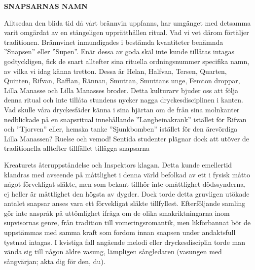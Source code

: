 \begin{intersong}

\textbf{SNAPSARNAS NAMN}

\begin{scriptsize}
Alltsedan den blida tid då vårt brännvin uppfanns, har umgänget med detsamma varit omgärdat av en stängeligen upprätthållen ritual. Vad vi vet därom förtäljer traditionen. Brännvinet inmundigades i bestämda kvantiteter benämnda ''Snapsen'' eller ''Supen''. Enär dessa av goda skäl inte kunde tillåtas intagas godtyckligen, fick de snart alltefter sina rituella ordningsnummer specifika namn, av vilka vi idag känna tretton. Dessa är Helan, Halfvan, Tersen, Quarten, Quinten, Rifvan, Rafflan, Rännan, Smuttan, Smuttans unge, Femton droppar, Lilla Manasse och Lilla Manasses broder. Detta kulturarv bjuder oss att följa denna ritual och inte tillåta stundens nycker nagga dryckesdisciplinen i kanten. Vad skulle våra dryckesfäder känna i sina hjärtan om de från sina molnkanter nedblickade på en snapsritual innehållande ''Langbeinakrank'' istället för Rifvan och ''Tjorven'' eller, hemska tanke ''Sjunkbomben'' istället för den ärevördiga Lilla Manassen? Ruelse och vemod! Sentida studenter plägnar dock att utöver de traditionella alltefter tillfället tillägga snapsarna 
\end{scriptsize}
\end{intersong}

\begin{intersong}
\begin{scriptsize}
Kreaturets återuppståndelse och Inspektors klagan. Detta kunde emellertid klandras med avseende på måttlighet i denna värld befolkad av ett i fysisk måtto något förvekligat släkte, men som bekant tillhör inte omåttlighet dödssynderna, ej heller är måttlighet den högsta av dygder. Dock torde detta gruvligen utökade antalet snapsar anses vara ett förvekligat släkte tillfyllest. Efterföljande samling gör inte anspråk på uttömlighet ifråga om de olika smakriktningarna inom supvisornas genre, från tradition till vomeringsromantik, men likförbannat bör de uppstämmas med samma kraft som fordom innan snapsen under andaktsfull tystnad intagas. I kvistiga fall angående melodi eller dryckesdisciplin torde man vända sig till någon äldre vasung, lämpligen sångledaren (vasungen med sångvärjan; akta dig för den, du).
\end{scriptsize}

\end{intersong}

